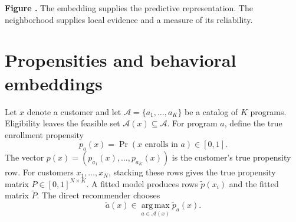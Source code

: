 \documentclass[10pt]{article}
\theoremstyle{noteplain}
\theoremstyle{definition}
\newcommand{\cA}{\mathcal A}
\newcommand{\argmax}{\operatorname*{arg\,max}}
\begin{document}
\begin{center}
\par\vspace{0.7em}
\parbox{.94\linewidth}{\small\textbf{Figure \thefigure.} The embedding supplies the predictive representation. The neighborhood supplies local evidence and a measure of its reliability.}
\end{center}

\section{Propensities and behavioral embeddings}

Let $x$ denote a customer and let $\cA=\{a_1,\ldots,a_K\}$ be a catalog of $K$ programs. Eligibility leaves the feasible set $\cA(x)\subseteq\cA$. For program $a$, define the true enrollment propensity
\[
 p_a(x)=\Pr(\text{$x$ enrolls in $a$})\in[0,1].
\]
The vector $p(x)=(p_{a_1}(x),\ldots,p_{a_K}(x))$ is the customer's true propensity row. For customers $x_1,\ldots,x_N$, stacking these rows gives the true propensity matrix $P\in[0,1]^{N\times K}$. A fitted model produces rows $\widetilde p(x_i)$ and the fitted matrix $\widetilde P$. The direct recommender chooses
\begin{equation}\label{eq:base}
 \widetilde a(x)\in\argmax_{a\in\cA(x)}\widetilde p_a(x).
\end{equation}
\end{document}

